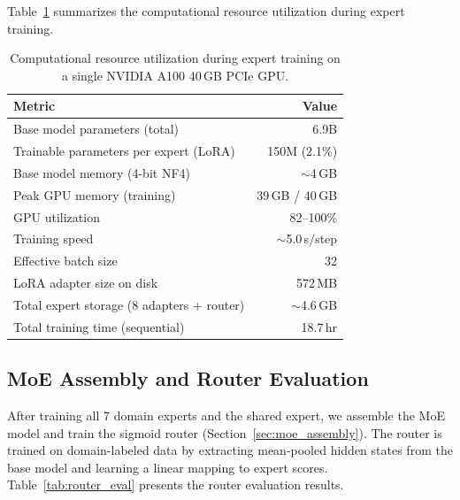 \documentclass[11pt,a4paper]{article}
\begin{document}
Table~\ref{tab:compute} summarizes the computational resource utilization during expert training.

\begin{table}[t]
\centering
\caption{Computational resource utilization during expert training on a single NVIDIA A100 40\,GB PCIe GPU.}
\label{tab:compute}
\small
\begin{tabular}{@{}lr@{}}
\toprule
\textbf{Metric} & \textbf{Value} \\
\midrule
Base model parameters (total) & 6.9B \\
Trainable parameters per expert (LoRA) & 150M (2.1\%) \\
Base model memory (4-bit NF4) & ${\sim}$4\,GB \\
Peak GPU memory (training) & 39\,GB / 40\,GB \\
GPU utilization & 82--100\% \\
Training speed & ${\sim}$5.0\,s/step \\
Effective batch size & 32 \\
LoRA adapter size on disk & 572\,MB \\
Total expert storage (8 adapters + router) & ${\sim}$4.6\,GB \\
Total training time (sequential) & 18.7\,hr \\
\bottomrule
\end{tabular}
\end{table}


\subsection{MoE Assembly and Router Evaluation}

After training all 7 domain experts and the shared expert, we assemble the MoE model and train the sigmoid router (Section~\ref{sec:moe_assembly}). The router is trained on domain-labeled data by extracting mean-pooled hidden states from the base model and learning a linear mapping to expert scores. Table~\ref{tab:router_eval} presents the router evaluation results.
\end{document}
